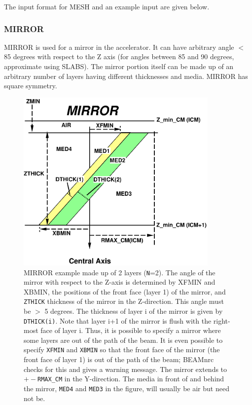 \documentclass[12pt,twoside]{article}
\begin{document}
\clearpage

The input format for MESH and an example input are given below.
\begin{small}

\end{small}


\clearpage

\subsubsection{MIRROR}
\renewcommand{\rightmark}{MIRROR CM}

MIRROR is used for a mirror in the accelerator. It can have arbitrary
angle $<$ 85 degrees with respect to the Z axis (for angles between
85 and 90 degrees, approximate using SLABS).  The mirror portion itself can be
made up of an arbitrary
number
of layers having different thicknesses and media.  MIRROR has square symmetry.


\begin{figure}[htbp]
\begin{center}
\leavevmode
\mbox{}\hspace{0cm}
\includegraphics[height=9cm]{figures/mirrord}
\caption[MIRROR CM geometry.]
{MIRROR example made up of 2 layers ({\tt N}=2).  The angle of the mirror with respect
to the Z-axis is determined by XFMIN and XBMIN, the positions of the
front face (layer 1) of the mirror, and {\tt ZTHICK} thickness of the
mirror in the Z-direction.  This angle must be $>$ 5 degrees.  The thickness of
layer i of the mirror is
given by {\tt DTHICK(i)}.  Note that layer i+1 of the mirror is flush with the
right-most face of layer i.  Thus, it is possible to specify a mirror
where some layers are out of the path of the beam.  It is even possible
to specify {\tt XFMIN} and {\tt XBMIN} so that the front face of the mirror (the
front face of layer 1) is out of the path of the beam; BEAMnrc checks for
this and gives a warning message.  The mirror extends to $+-${\tt RMAX\_CM} in
the Y-direction.  The media in front of and behind the mirror, {\tt MED4} and
{\tt MED3} in the figure, will usually be air but need not be.}
\label{fig_MIRRORD}
\end{center}
\end{figure}
\clearpage
\end{document}
